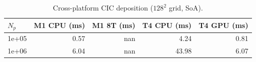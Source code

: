 \begin{table}[t]
\centering
\small
\caption{Cross-platform CIC deposition ($128^2$ grid, SoA).}
\label{tab:cross_platform}
\begin{tabular}{lrrrr}
\toprule
$N_p$ & M1 CPU (ms) & M1 8T (ms) & T4 CPU (ms) & T4 GPU (ms) \\
\midrule
1e+05 & 0.57 & nan & 4.24 & 0.81 \\
1e+06 & 6.04 & nan & 43.98 & 6.07 \\
\bottomrule
\end{tabular}
\end{table}
